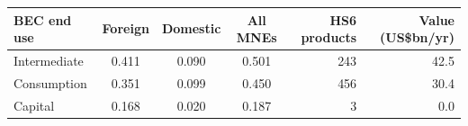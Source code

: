 \begin{tabular}{lcccrr}
\toprule
BEC end use & Foreign & Domestic & All MNEs & HS6 products & Value (US\$bn/yr) \\
\midrule
Intermediate & 0.411 & 0.090 & 0.501 & 243 & 42.5 \\
Consumption & 0.351 & 0.099 & 0.450 & 456 & 30.4 \\
Capital & 0.168 & 0.020 & 0.187 & 3 & 0.0 \\
\bottomrule
\end{tabular}
